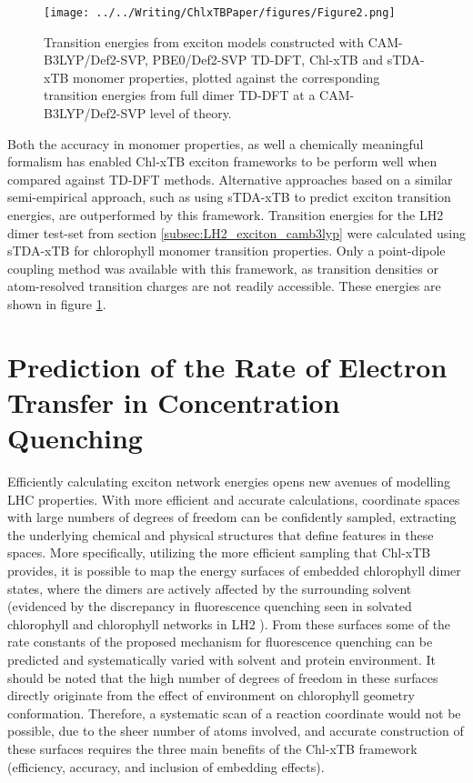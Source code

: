 \begin{figure}
    \centering
    \texttt{[image: ../../Writing/ChlxTBPaper/figures/Figure2.png]}
    \caption{Transition energies from exciton models constructed with CAM-B3LYP/Def2-SVP,
    PBE0/Def2-SVP TD-DFT, Chl-xTB and sTDA-xTB monomer properties, plotted against 
    the corresponding transition energies from full dimer TD-DFT at a CAM-B3LYP/Def2-SVP 
    level of theory.}
    \label{fig:dimer_w_stda}
\end{figure}

Both the accuracy in monomer properties, as well a chemically meaningful formalism
has enabled Chl-xTB exciton frameworks to be perform well when compared against
TD-DFT methods. Alternative approaches based on a similar semi-empirical approach,
such as using sTDA-xTB to predict exciton transition energies, are outperformed 
by this framework. Transition energies for the LH2 dimer test-set from section \ref{subsec:LH2_exciton_camb3lyp}
were calculated using sTDA-xTB for chlorophyll monomer transition properties. Only
a point-dipole coupling method was available with this framework, as transition 
densities or atom-resolved transition charges are not readily accessible. These
energies are shown in figure \ref{fig:dimer_w_stda}.

\section{Prediction of the Rate of Electron Transfer in Concentration Quenching}
\label{sec:concentration_quenching}
 
Efficiently calculating exciton network energies opens new avenues of modelling 
LHC properties. With more efficient and accurate calculations, coordinate spaces 
with large numbers of degrees of freedom can be confidently sampled, extracting 
the underlying chemical and physical structures that define features in these spaces.
More specifically, utilizing the more efficient sampling that Chl-xTB provides,
it is possible to map the energy surfaces of embedded chlorophyll dimer states, 
where the dimers are actively affected by the surrounding solvent (evidenced by 
the discrepancy in fluorescence quenching seen in solvated chlorophyll and chlorophyll 
networks in LH2 \cite{Watson1950}). From these surfaces some of the rate constants 
of the proposed mechanism for fluorescence quenching can be predicted and systematically 
varied with solvent and protein environment. It should be noted that the high number 
of degrees of freedom in these surfaces directly originate from the effect of environment
on chlorophyll geometry conformation. Therefore, a systematic scan of a reaction 
coordinate would not be possible, due to the sheer number of atoms involved, and
accurate construction of these surfaces requires the three main benefits of the 
Chl-xTB framework (efficiency, accuracy, and inclusion of embedding effects).

